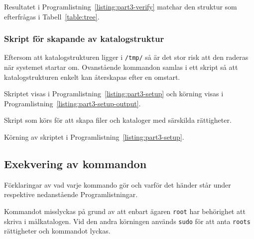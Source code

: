 Resultatet i Programlistning~\ref{listing:part3-verify} matchar den
struktur som efterfrågas i Tabell~\ref{table:tree}.


\subsubsection{Skript för skapande av katalogstruktur}
Eftersom att katalogstrukturen ligger i \texttt{/tmp/} så är det stor risk att
den raderas när systemet startar om. Ovanstående kommandon samlas i ett skript
så att katalogstrukturen enkelt kan återskapas efter en omstart.

Skriptet visas i Programlistning~\ref{listing:part3-setup} och körning visas i
Programlistning~\ref{listing:part3-setup-output}.

\begin{listing}[H]
\caption{Skript som körs för att skapa filer och kataloger med särskilda rättigheter.}
\label{listing:part3-setup}
\end{listing}

\begin{listing}[H]
\caption{Körning av skriptet i Programlistning~\ref{listing:part3-setup}.}
\label{listing:part3-setup-output}
\end{listing}


\subsection{Exekvering av kommandon}
%
%

\newcommand{\explainedcmd}[4]{
\begin{listing}[H]
\shellcode[firstline={#1},lastline={#2}]{tex/part3-commands}
\caption{#3}
\label{listing:ntp-conf-mod}
\end{listing}
}

Förklaringar av vad varje kommando gör och varför det händer står under
respektive nedanstående Programlistningar.

             {Kommandot misslyckas på grund av att enbart ägaren \texttt{root} 
              har behörighet att skriva i målkatalogen.  
              Vid den andra körningen används \texttt{sudo} för att anta 
              \texttt{roots} rättigheter och kommandot lyckas.}

